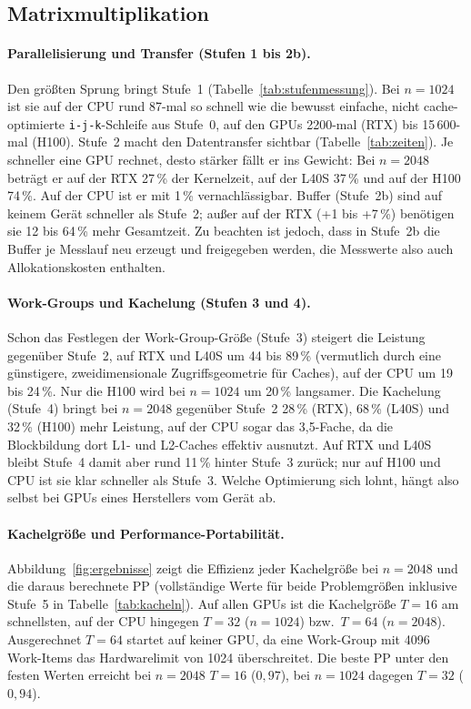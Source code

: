 \documentclass[12pt,a4paper]{article}
\begin{document}
\subsection{Matrixmultiplikation}\label{sec:e-matmul}

\paragraph{Parallelisierung und Transfer (Stufen 1 bis 2b).}
Den größten Sprung bringt Stufe~1 (Tabelle~\ref{tab:stufenmessung}). Bei
$n = 1024$ ist sie auf der CPU rund 87-mal so schnell wie die bewusst einfache,
nicht cache-optimierte \texttt{i-j-k}-Schleife aus Stufe~0, auf den GPUs
2200-mal (RTX) bis 15\,600-mal (H100). Stufe~2 macht den Datentransfer sichtbar
(Tabelle~\ref{tab:zeiten}). Je schneller eine GPU rechnet, desto stärker fällt
er ins Gewicht: Bei $n = 2048$ beträgt er auf der RTX 27\,\% der Kernelzeit,
auf der L40S 37\,\% und auf der H100 74\,\%. Auf der CPU ist er mit 1\,\%
vernachlässigbar. Buffer (Stufe~2b) sind auf keinem Gerät schneller als
Stufe~2; außer auf der RTX (+1 bis +7\,\%) benötigen sie 12 bis 64\,\% mehr
Gesamtzeit. Zu beachten ist jedoch, dass in Stufe~2b die Buffer je Messlauf neu
erzeugt und freigegeben werden, die Messwerte also auch Allokationskosten
enthalten.

\paragraph{Work-Groups und Kachelung (Stufen 3 und 4).}
Schon das Festlegen der Work-Group-Größe (Stufe~3) steigert die Leistung
gegenüber Stufe~2, auf RTX und L40S um 44 bis 89\,\% (vermutlich durch eine
günstigere, zweidimensionale Zugriffsgeometrie für Caches), auf der CPU um
19 bis 24\,\%. Nur die H100 wird bei $n = 1024$ um 20\,\% langsamer. Die
Kachelung (Stufe~4) bringt bei $n = 2048$ gegenüber Stufe~2 28\,\% (RTX), 68\,\%
(L40S) und 32\,\% (H100) mehr Leistung, auf der CPU sogar das 3,5-Fache, da die
Blockbildung dort L1- und L2-Caches effektiv ausnutzt. Auf RTX und L40S bleibt
Stufe~4 damit aber rund 11\,\% hinter Stufe~3 zurück; nur auf H100 und CPU ist
sie klar schneller als Stufe~3. Welche Optimierung sich lohnt, hängt also selbst
bei GPUs eines Herstellers vom Gerät ab.

\paragraph{Kachelgröße und Performance-Portabilität.}
Abbildung~\ref{fig:ergebnisse} zeigt die Effizienz jeder Kachelgröße bei
$n = 2048$ und die daraus berechnete PP (vollständige Werte für beide
Problemgrößen inklusive Stufe~5 in Tabelle~\ref{tab:kacheln}). Auf allen GPUs
ist die Kachelgröße $T = 16$ am schnellsten, auf der CPU hingegen $T = 32$
($n = 1024$) bzw.\ $T = 64$ ($n = 2048$). Ausgerechnet $T = 64$ startet auf
keiner GPU, da eine Work-Group mit 4096 Work-Items das Hardwarelimit von 1024
überschreitet. Die beste PP unter den festen Werten erreicht bei $n = 2048$
$T = 16$ ($0{,}97$), bei $n = 1024$ dagegen $T = 32$ ($0{,}94$).
\end{document}
